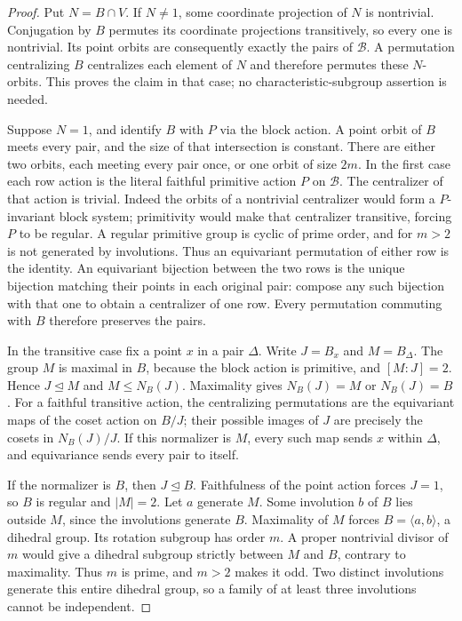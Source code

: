 \documentclass[11pt,a4paper]{article}
\newcommand{\gen}[1]{\langle#1\rangle}
\begin{document}
\begin{proof}
Put $N=B\cap V$. If $N\ne1$, some coordinate projection of
$N$ is nontrivial. Conjugation by $B$ permutes its coordinate
projections transitively, so every one is nontrivial. Its point
orbits are consequently exactly the pairs of $\mathcal B$.
A permutation centralizing $B$ centralizes each element of $N$
and therefore permutes these $N$-orbits. This proves the claim
in that case; no characteristic-subgroup assertion is needed.

Suppose $N=1$, and identify $B$ with $P$ via the block action.
A point orbit of $B$ meets every pair, and the size of that
intersection is constant. There are either two orbits, each
meeting every pair once, or one orbit of size $2m$.
In the first case each row action is the literal faithful
primitive action $P$ on $\mathcal B$. The centralizer of that
action is trivial. Indeed the orbits of a nontrivial centralizer
would form a $P$-invariant block system; primitivity would make
that centralizer transitive, forcing $P$ to be regular. A regular
primitive group is cyclic of prime order, and for $m>2$ is not
generated by involutions. Thus an equivariant permutation of
either row is the identity. An equivariant bijection between
the two rows is the unique bijection matching their points in
each original pair: compose any such bijection with that one
to obtain a centralizer of one row. Every permutation commuting
with $B$ therefore preserves the pairs.

In the transitive case fix a point $x$ in a pair $\Delta$.
Write $J=B_x$ and $M=B_\Delta$. The group $M$ is maximal in
$B$, because the block action is primitive, and $[M:J]=2$.
Hence $J\unlhd M$ and $M\le N_B(J)$. Maximality gives
$N_B(J)=M$ or $N_B(J)=B$.
For a faithful transitive action, the centralizing permutations
are the equivariant maps of the coset action on $B/J$; their
possible images of $J$ are precisely the cosets in $N_B(J)/J$.
If this normalizer is $M$, every such map sends $x$ within
$\Delta$, and equivariance sends every pair to itself.

If the normalizer is $B$, then $J\unlhd B$. Faithfulness of
the point action forces $J=1$, so $B$ is regular and $|M|=2$.
Let $a$ generate $M$. Some involution $b$ of $B$ lies outside
$M$, since the involutions generate $B$. Maximality of $M$
forces $B=\gen{a,b}$, a dihedral group. Its rotation subgroup
has order $m$. A proper nontrivial divisor of $m$ would give
a dihedral subgroup strictly between $M$ and $B$, contrary to
maximality. Thus $m$ is prime, and $m>2$ makes it odd.
Two distinct involutions generate this entire dihedral group,
so a family of at least three involutions cannot be independent.
\end{proof}
\end{document}
